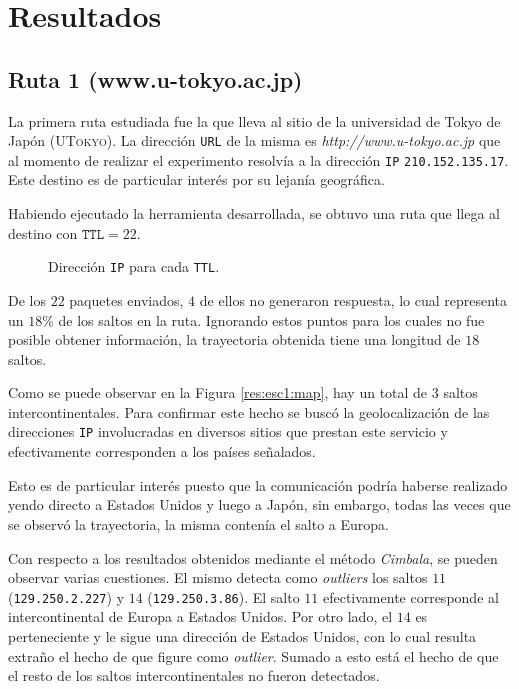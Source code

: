 \section{Resultados}

\subsection{Ruta 1 (www.u-tokyo.ac.jp)}

La primera ruta estudiada fue la que lleva al sitio de la
universidad de Tokyo de Japón (\textsc{UTokyo}). La dirección \texttt{URL} de la
misma es \emph{http://www.u-tokyo.ac.jp} que al momento de realizar el
experimento resolvía a la dirección \texttt{IP} \texttt{210.152.135.17}. Este
destino es de particular interés por su lejanía geográfica.

Habiendo ejecutado la herramienta desarrollada, se obtuvo una ruta que llega al
destino con $\texttt{TTL} = 22$.

\begin{figure}[H]
    \caption{Dirección \texttt{IP} para cada \texttt{TTL}.}
\end{figure}

De los $22$ paquetes enviados, $4$ de ellos no generaron
respuesta, lo cual representa un $18$\% de los saltos en la ruta. Ignorando
estos puntos para los cuales no fue posible obtener información, la trayectoria
obtenida tiene una longitud de $18$ saltos.

Como se puede observar en la Figura \ref{res:esc1:map}, hay un total de 3 saltos
intercontinentales. Para confirmar este hecho se buscó la geolocalización de las
direcciones \texttt{IP} involucradas en diversos sitios que prestan este
servicio y efectivamente corresponden a los países señalados.

\begin{figure*}
    \caption{Localización de saltos según geolocalización de direcciones IP para
    el sitio \emph{www.u-tokyo.ac.jp}.}
    \label{res:esc1:map}
\end{figure*}

Esto es de particular interés puesto que la comunicación podría haberse
realizado yendo directo a Estados Unidos y luego a Japón, sin embargo, todas las
veces que se observó la trayectoria, la misma contenía el salto a Europa.

Con respecto a los resultados obtenidos mediante el método \emph{Cimbala}, se
pueden observar varias cuestiones. El mismo detecta como \emph{outliers} los
saltos $11$ (\texttt{129.250.2.227}) y $14$ (\texttt{129.250.3.86}). El salto
$11$ efectivamente corresponde al intercontinental de Europa a Estados Unidos.
Por otro lado, el $14$ es perteneciente y le sigue una dirección de Estados Unidos,
con lo cual resulta extraño el hecho de que figure como \emph{outlier}. Sumado a
esto está el hecho de que el resto de los saltos intercontinentales no fueron
detectados.

